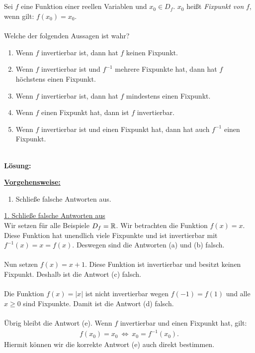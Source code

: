 \subsection*{}
Sei $ f $ eine Funktion einer reellen Variablen und $ x_0 \in D_f $.
$ x_0  $ heißt \textit{Fixpunkt von} $ f $, wenn gilt: $ f(x_0) = x_0 $.\\
\\
Welche der folgenden Aussagen ist wahr? 
\renewcommand{\labelenumi}{(\alph{enumi})}
\begin{enumerate}
	\item 
	Wenn $ f $ invertierbar ist, dann hat $ f $ keinen Fixpunkt.
	\item
	Wenn $ f $ invertierbar ist und $ f^{-1} $ mehrere Fixpunkte hat, dann hat $ f $ höchstens einen Fixpunkt.
	\item
	Wenn $ f $ invertierbar ist, dann hat $ f $ mindestens einen Fixpunkt.
	\item
	Wenn $ f  $ einen Fixpunkt hat, dann ist $ f $ invertierbar.
	\item
	Wenn $ f $ invertierbar ist und einen Fixpunkt hat, dann hat auch $ f^{-1} $ einen Fixpunkt.
\end{enumerate}
\ \\
\textbf{Lösung:}
\begin{mdframed}
\underline{\textbf{Vorgehensweise:}}
\renewcommand{\labelenumi}{\theenumi.}
\begin{enumerate}
\item Schließe falsche Antworten aus.
\end{enumerate}
\end{mdframed}

\underline{1. Schließe falsche Antworten aus}\\
Wir setzen für alle Beispiele $ D_f = \mathbb{R} $.
Wir betrachten die Funktion $ f(x) = x $. Diese Funktion hat unendlich viele Fixpunkte und ist invertierbar mit $ f^{-1}(x) = x =f(x) $. 
Deswegen sind die Antworten (a) und (b) falsch.\\
\\
Nun setzen $ f(x) = x + 1 $. Diese Funktion ist invertierbar und besitzt keinen Fixpunkt.
Deshalb ist die Antwort (c) falsch.\\
\\
Die Funktion $ f(x) = |x| $ ist nicht invertierbar wegen $ f(-1) = f(1) $ und alle $ x \geq 0  $ sind Fixpunkte.
Damit ist die Antwort (d) falsch.\\
\\
Übrig bleibt die Antwort (e). Wenn $ f  $ invertierbar und einen Fixpunkt hat, gilt: 
\begin{align*}
	f(x_0) = x_0 
	\ \Leftrightarrow \
	x_0 = f^{-1}(x_0).
\end{align*}
Hiermit können wir die korrekte Antwort (e) auch direkt bestimmen.

